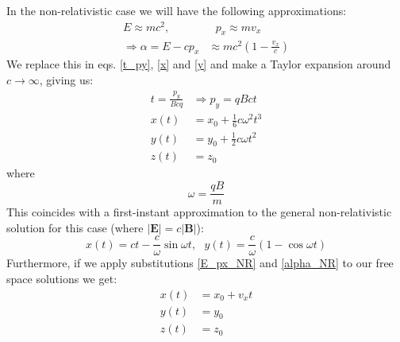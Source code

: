 \documentclass[]{article}
\numberwithin{equation}{section}
\newcommand{\0}{\textcolor{gray}{0}}
\begin{document}
In the non-relativistic case we will have the following approximations:
\begin{align}
	E \approx m c^2 ,&\ \ \ p_x \approx m v_x\label{E_px_NR}\\
	\Rightarrow\alpha = E - c p_x &\approx m c^2 \left(1 - \frac{v_x}{c} \right)\label{alpha_NR}
\end{align}
We replace this in eqs. \ref{t_py}, \ref{x} and \ref{y} and make a Taylor expansion around \(c\rightarrow\infty\), giving us:
\begin{align}
	t = \frac{p_y}{B c q} &\Rightarrow p_y = q B c t\\
	x(t) &= x_0 + \frac{1}{6} c \omega^2 t^3\\
	y(t) &= y_0 + \frac{1}{2} c \omega t^2\\
	z(t) &= z_0
\end{align}
where
\begin{equation}
	\omega = \frac{q B}{m}
\end{equation}
This coincides with a first-instant approximation to the general non-relativistic solution for this case (where \(|\mathbf{E}| = c|\mathbf{B}|\)):
\begin{equation}
	x(t) = ct - \frac{c}{\omega}\sin\omega t, \ \ \ y(t) = \frac{c}{\omega}\left(1 - \cos\omega t\right)
\end{equation}
Furthermore, if we apply substitutions \ref{E_px_NR} and \ref{alpha_NR} to our free space solutions we get:
\begin{align}
	x(t) &= x_0 + v_x t\\
	y(t) &= y_0\\
	z(t) &= z_0
\end{align}
\end{document}

